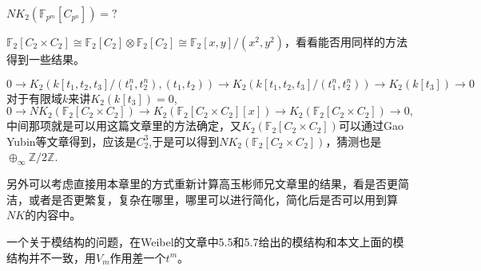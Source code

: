 $NK_2(\mathbb{F}_{p^m}[C_{p^n}])=?$

$\mathbb{F}_2[C_2\times C_2] \cong\mathbb{F}_2[C_2]\otimes\mathbb{F}_2[C_2] \cong \mathbb{F}_2[x,y]/(x^2,y^2)$，看看能否用同样的方法得到一些结果。



\[
	0\longrightarrow K_2(k[t_1,t_2,t_3]/(t_1^n,t_2^n),(t_1,t_2)) \longrightarrow K_2(k[t_1,t_2,t_3]/(t_1^n,t_2^n)) \longrightarrow K_2(k[t_3]) \longrightarrow 0
	\]
对于有限域$k$来讲$K_2(k[t_3])=0$,
\[0\longrightarrow NK_2(\mathbb{F}_2[C_{2}\times C_2]) \longrightarrow K_2(\mathbb{F}_2[C_{2}\times C_2][x])\longrightarrow K_2(\mathbb{F}_2[C_{2}\times C_2]) \longrightarrow 0,\]
中间那项就是可以用这篇文章里的方法确定，又$K_2(\mathbb{F}_2[C_{2}\times C_2])$可以通过Gao Yubin等文章得到，应该是$C_2^3$,于是可以得到$NK_2(\mathbb{F}_2[C_{2}\times C_2])$，猜测也是$\oplus_{\infty} \mathbb{Z}/2 \mathbb{Z}$.

另外可以考虑直接用本章里的方式重新计算高玉彬师兄文章里的结果，看是否更简洁，或者是否更繁复，复杂在哪里，哪里可以进行简化，简化后是否可以用到算$NK$的内容中。


一个关于模结构的问题，在Weibel的文章\cite{MR88f:18018}中5.5和5.7给出的模结构和本文上面的模结构并不一致，用$V_m$作用差一个$t^m$。





